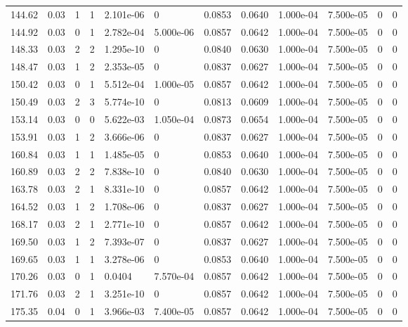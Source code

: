 \documentclass[preview]{standalone}
\begin{document}
{{{\begin{tabular}{L{1.2cm}C{1.2cm} C{0.3cm}C{0.5cm} C{1.4cm}C{1.4cm} C{1.4cm}C{1.4cm} C{1.6cm}C{1.6cm} C{1.6cm}C{1.6cm}}
  144.62  &  0.03  & 1     &  1 &  2.101e-06  & 0  &  0.0853&   0.0640& 1.000e-04 & 7.500e-05   &  0 & 0  \\ 
  144.92  &  0.03  & 0     &  1 &  2.782e-04  & 5.000e-06  &  0.0857&   0.0642& 1.000e-04 & 7.500e-05   &  0 & 0  \\ 
  148.33  &  0.03  & 2     &  2 &  1.295e-10  & 0  &  0.0840&   0.0630& 1.000e-04 & 7.500e-05   &  0 & 0  \\ 
  148.47  &  0.03  & 1     &  2 &  2.353e-05  & 0  &  0.0837&   0.0627& 1.000e-04 & 7.500e-05   &  0 & 0  \\ 
  150.42  &  0.03  & 0     &  1 &  5.512e-04  & 1.000e-05  &  0.0857&   0.0642& 1.000e-04 & 7.500e-05   &  0 & 0  \\ 
  150.49  &  0.03  & 2     &  3 &  5.774e-10  & 0  &  0.0813&   0.0609& 1.000e-04 & 7.500e-05   &  0 & 0  \\ 
  153.14  &  0.03  & 0     &  0 &  5.622e-03  & 1.050e-04  &  0.0873&   0.0654& 1.000e-04 & 7.500e-05   &  0 & 0  \\ 
  153.91  &  0.03  & 1     &  2 &  3.666e-06  & 0  &  0.0837&   0.0627& 1.000e-04 & 7.500e-05   &  0 & 0  \\ 
  160.84  &  0.03  & 1     &  1 &  1.485e-05  & 0  &  0.0853&   0.0640& 1.000e-04 & 7.500e-05   &  0 & 0  \\ 
  160.89  &  0.03  & 2     &  2 &  7.838e-10  & 0  &  0.0840&   0.0630& 1.000e-04 & 7.500e-05   &  0 & 0  \\ 
  163.78  &  0.03  & 2     &  1 &  8.331e-10  & 0  &  0.0857&   0.0642& 1.000e-04 & 7.500e-05   &  0 & 0  \\ 
  164.52  &  0.03  & 1     &  2 &  1.708e-06  & 0  &  0.0837&   0.0627& 1.000e-04 & 7.500e-05   &  0 & 0  \\ 
  168.17  &  0.03  & 2     &  1 &  2.771e-10  & 0  &  0.0857&   0.0642& 1.000e-04 & 7.500e-05   &  0 & 0  \\ 
  169.50  &  0.03  & 1     &  2 &  7.393e-07  & 0  &  0.0837&   0.0627& 1.000e-04 & 7.500e-05   &  0 & 0  \\ 
  169.65  &  0.03  & 1     &  1 &  3.278e-06  & 0  &  0.0853&   0.0640& 1.000e-04 & 7.500e-05   &  0 & 0  \\ 
  170.26  &  0.03  & 0     &  1 &  0.0404  & 7.570e-04  &  0.0857&   0.0642& 1.000e-04 & 7.500e-05   &  0 & 0  \\ 
  171.76  &  0.03  & 2     &  1 &  3.251e-10  & 0  &  0.0857&   0.0642& 1.000e-04 & 7.500e-05   &  0 & 0  \\ 
  175.35  &  0.04  & 0     &  1 &  3.966e-03  & 7.400e-05  &  0.0857&   0.0642& 1.000e-04 & 7.500e-05   &  0 & 0  \\ 

\end{tabular}}}}
\end{document}
